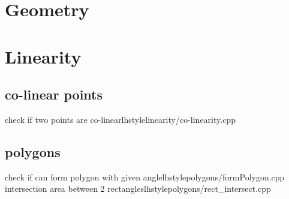 \section{Geometry}
    \section{Linearity}
      \subsection{co-linear points}
         {check if two points are co-linear}{lhstyle}{linearity/co-linearity.cpp}
      \subsection{polygons}
         {check if can form polygon with given angle}{lhstyle}{polygons/formPolygon.cpp}
         {intersection area between 2 rectangles}{lhstyle}{polygons/rect_intersect.cpp}
